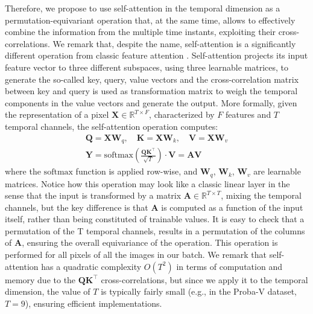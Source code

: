 \documentclass[journal]{IEEEtran}
\begin{document}
Therefore, we propose to use self-attention \cite{vaswani2017attention} in the temporal dimension as a permutation-equivariant operation that, at the same time, allows to effectively combine the information from the multiple time instants, exploiting their cross-correlations. We remark that, despite the name, self-attention is a significantly different operation from classic feature attention \cite{zhang2018image}. Self-attention projects its input feature vector to three different subspaces, using three learnable matrices, to generate the so-called key, query, value vectors and the cross-correlation matrix between key and query is used as transformation matrix to weigh the temporal components in the value vectors and generate the output. More formally, given the representation of a pixel $\mathbf{X} \in \mathbb{R}^{T \times F}$, characterized by $F$ features and $T$ temporal channels, the self-attention operation computes:
\begin{align*}
    \mathbf{Q}=\mathbf{X}\mathbf{W}_q,\quad \mathbf{K}=\mathbf{X}\mathbf{W}_k,\quad \mathbf{V}=\mathbf{X}\mathbf{W}_v\\
    \mathbf{Y}=  \mathrm{softmax}\left( \frac{\mathbf{Q}\mathbf{K}^\intercal}{\sqrt{T}}\right) \cdot \mathbf{V} = \mathbf{A} \mathbf{V}
\end{align*}
where the $\mathrm{softmax}$ function is applied row-wise, and $\mathbf{W}_q$, $\mathbf{W}_k$, $\mathbf{W}_v$ are learnable matrices.
Notice how this operation may look like a classic linear layer in the sense that the input is transformed by a matrix $\mathbf{A} \in \mathbb{R}^{T \times T}$, mixing the temporal channels, but the key difference is that $\mathbf{A}$ is computed as a function of the input itself, rather than being constituted of trainable values. It is easy to check that a permutation of the T temporal channels, results in a permutation of the columns of $\mathbf{A}$, ensuring the overall equivariance of the operation. This operation is performed for all pixels of all the images in our batch. We remark that self-attention has a quadratic complexity $O(T^2)$ in terms of computation and memory due to the $\mathbf{Q}\mathbf{K}^\intercal$ cross-correlations, but since we apply it to the temporal dimension, the value of $T$ is typically fairly small (e.g., in the Proba-V dataset, $T=9$), ensuring efficient implementations.
\end{document}
